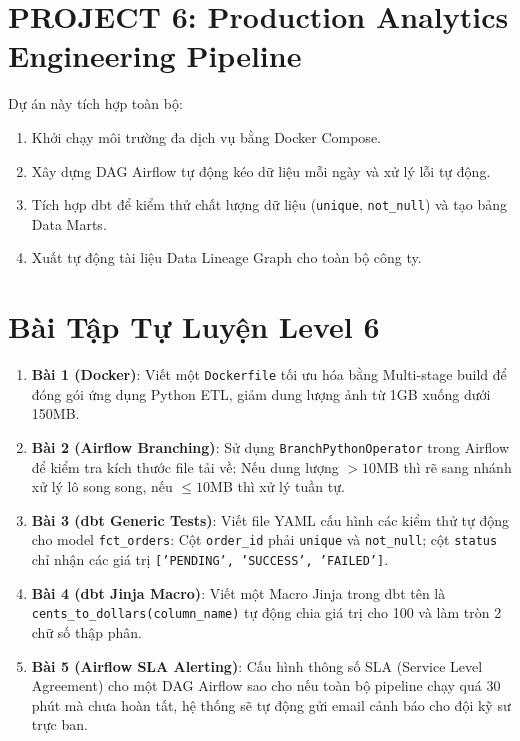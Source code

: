 \section{PROJECT 6: Production Analytics Engineering Pipeline}

Dự án này tích hợp toàn bộ:
\begin{enumerate}
    \item Khởi chạy môi trường đa dịch vụ bằng Docker Compose.
    \item Xây dựng DAG Airflow tự động kéo dữ liệu mỗi ngày và xử lý lỗi tự động.
    \item Tích hợp dbt để kiểm thử chất lượng dữ liệu (\texttt{unique}, \texttt{not\_null}) và tạo bảng Data Marts.
    \item Xuất tự động tài liệu Data Lineage Graph cho toàn bộ công ty.
\end{enumerate}

\section{Bài Tập Tự Luyện Level 6}

\begin{baitapbox}
\begin{enumerate}
    \item \textbf{Bài 1 (Docker)}: Viết một \texttt{Dockerfile} tối ưu hóa bằng Multi-stage build để đóng gói ứng dụng Python ETL, giảm dung lượng ảnh từ 1GB xuống dưới 150MB.
    \item \textbf{Bài 2 (Airflow Branching)}: Sử dụng \texttt{BranchPythonOperator} trong Airflow để kiểm tra kích thước file tải về: Nếu dung lượng $>10$MB thì rẽ sang nhánh xử lý lô song song, nếu $\le 10$MB thì xử lý tuần tự.
    \item \textbf{Bài 3 (dbt Generic Tests)}: Viết file YAML cấu hình các kiểm thử tự động cho model \texttt{fct\_orders}: Cột \texttt{order\_id} phải \texttt{unique} và \texttt{not\_null}; cột \texttt{status} chỉ nhận các giá trị \texttt{['PENDING', 'SUCCESS', 'FAILED']}.
    \item \textbf{Bài 4 (dbt Jinja Macro)}: Viết một Macro Jinja trong dbt tên là \texttt{cents\_to\_dollars(column\_name)} tự động chia giá trị cho 100 và làm tròn 2 chữ số thập phân.
    \item \textbf{Bài 5 (Airflow SLA Alerting)}: Cấu hình thông số SLA (Service Level Agreement) cho một DAG Airflow sao cho nếu toàn bộ pipeline chạy quá 30 phút mà chưa hoàn tất, hệ thống sẽ tự động gửi email cảnh báo cho đội kỹ sư trực ban.
\end{enumerate}
\end{baitapbox}


